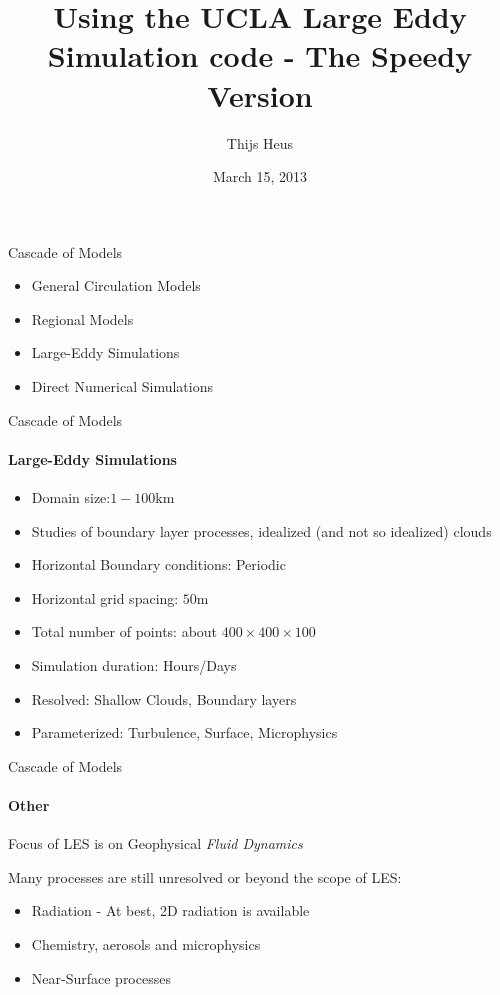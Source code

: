 \documentclass[handout]{beamer}
\title[UCLALES Tutorial]{Using the UCLA Large Eddy Simulation code  - The Speedy Version}
\author[HERZ-CC]{Thijs Heus}
\institute{Max Planck Institute for Meteorology}
\date{March 15, 2013}
\begin{document}
\begin{frame}[plain]
\titlepage
\end{frame}

\begin{frame}[<+->]{Cascade of Models}
 \begin{itemize}
  \item General Circulation Models
  \item Regional Models
  \item \alert{Large-Eddy Simulations}
  \item Direct Numerical Simulations
 \end{itemize}

\end{frame}
\begin{frame}{Cascade of Models}
\framesubtitle{Large-Eddy Simulations}
\begin{itemize}
 \item Domain size:$1 - 100\mathrm{km}$
 \item Studies of boundary layer processes, idealized (and not so idealized) clouds
 \item Horizontal Boundary conditions: Periodic
 \item Horizontal grid spacing: $50 \mathrm{m}$
 \item Total number of points: about $400 \times 400 \times 100 $
 \item Simulation duration: Hours/Days
 \item Resolved: Shallow Clouds,  Boundary layers
 \item Parameterized: Turbulence, Surface, Microphysics
\end{itemize}
 
\end{frame}
\begin{frame}{Cascade of Models}
\framesubtitle{Other}
Focus of LES is on Geophysical \emph{Fluid Dynamics}

Many processes are still unresolved or beyond the scope of LES:
\begin{itemize}
 \item Radiation - At best, 2D radiation is available
 \item Chemistry, aerosols and microphysics
 \item Near-Surface processes
\end{itemize}
\end{frame}
\end{document}
